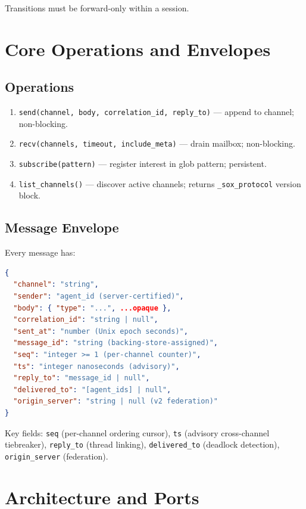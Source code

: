 \documentclass[11pt]{article}
\begin{document}
Transitions must be forward-only within a session.

\section{Core Operations and Envelopes}

\subsection{Operations}

\begin{enumerate}
  \item \texttt{send(channel, body, correlation\_id, reply\_to)} --- append to channel; non-blocking.
  \item \texttt{recv(channels, timeout, include\_meta)} --- drain mailbox; non-blocking.
  \item \texttt{subscribe(pattern)} --- register interest in glob pattern; persistent.
  \item \texttt{list\_channels()} --- discover active channels; returns \texttt{\_sox\_protocol} version block.
\end{enumerate}

\subsection{Message Envelope}

Every message has:

\begin{lstlisting}[language=json]
{
  "channel": "string",
  "sender": "agent_id (server-certified)",
  "body": { "type": "...", ...opaque },
  "correlation_id": "string | null",
  "sent_at": "number (Unix epoch seconds)",
  "message_id": "string (backing-store-assigned)",
  "seq": "integer >= 1 (per-channel counter)",
  "ts": "integer nanoseconds (advisory)",
  "reply_to": "message_id | null",
  "delivered_to": "[agent_ids] | null",
  "origin_server": "string | null (v2 federation)"
}
\end{lstlisting}

Key fields: \texttt{seq} (per-channel ordering cursor), \texttt{ts} (advisory cross-channel tiebreaker), \texttt{reply\_to} (thread linking), \texttt{delivered\_to} (deadlock detection), \texttt{origin\_server} (federation).

\section{Architecture and Ports}
\end{document}
